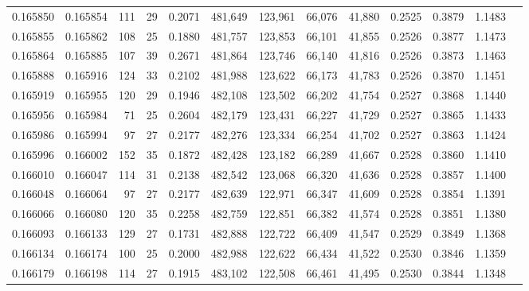 \begin{tabular}{rrrrrrrrrrrrr}
0.165850 & 0.165854 &   111 &  29 &                                     0.2071 & 481,649 & 123,961 &  66,076 &  41,880 & 0.2525 & 0.3879 & 1.1483 \\
0.165855 & 0.165862 &   108 &  25 &                                     0.1880 & 481,757 & 123,853 &  66,101 &  41,855 & 0.2526 & 0.3877 & 1.1473 \\
0.165864 & 0.165885 &   107 &  39 &                                     0.2671 & 481,864 & 123,746 &  66,140 &  41,816 & 0.2526 & 0.3873 & 1.1463 \\
0.165888 & 0.165916 &   124 &  33 &                                     0.2102 & 481,988 & 123,622 &  66,173 &  41,783 & 0.2526 & 0.3870 & 1.1451 \\
0.165919 & 0.165955 &   120 &  29 &                                     0.1946 & 482,108 & 123,502 &  66,202 &  41,754 & 0.2527 & 0.3868 & 1.1440 \\
0.165956 & 0.165984 &    71 &  25 &                                     0.2604 & 482,179 & 123,431 &  66,227 &  41,729 & 0.2527 & 0.3865 & 1.1433 \\
0.165986 & 0.165994 &    97 &  27 &                                     0.2177 & 482,276 & 123,334 &  66,254 &  41,702 & 0.2527 & 0.3863 & 1.1424 \\
0.165996 & 0.166002 &   152 &  35 &                                     0.1872 & 482,428 & 123,182 &  66,289 &  41,667 & 0.2528 & 0.3860 & 1.1410 \\
0.166010 & 0.166047 &   114 &  31 &                                     0.2138 & 482,542 & 123,068 &  66,320 &  41,636 & 0.2528 & 0.3857 & 1.1400 \\
0.166048 & 0.166064 &    97 &  27 &                                     0.2177 & 482,639 & 122,971 &  66,347 &  41,609 & 0.2528 & 0.3854 & 1.1391 \\
0.166066 & 0.166080 &   120 &  35 &                                     0.2258 & 482,759 & 122,851 &  66,382 &  41,574 & 0.2528 & 0.3851 & 1.1380 \\
0.166093 & 0.166133 &   129 &  27 &                                     0.1731 & 482,888 & 122,722 &  66,409 &  41,547 & 0.2529 & 0.3849 & 1.1368 \\
0.166134 & 0.166174 &   100 &  25 &                                     0.2000 & 482,988 & 122,622 &  66,434 &  41,522 & 0.2530 & 0.3846 & 1.1359 \\
0.166179 & 0.166198 &   114 &  27 &                                     0.1915 & 483,102 & 122,508 &  66,461 &  41,495 & 0.2530 & 0.3844 & 1.1348 \\

\end{tabular}
